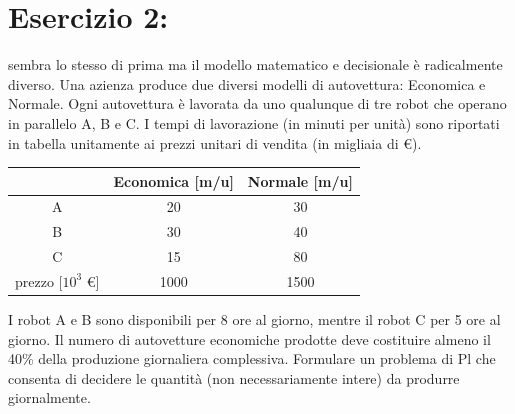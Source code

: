 \section{Esercizio 2:} sembra lo stesso di prima ma il modello matematico e decisionale è radicalmente diverso. Una azienza produce due diversi modelli di autovettura: Economica e Normale. Ogni autovettura è lavorata da uno qualunque di tre robot che operano in parallelo A, B e C. I tempi di lavorazione (in minuti per unità) sono riportati in tabella unitamente ai prezzi unitari di vendita (in migliaia di \euro).
\begin{table}[h!]
    \centering
    \begin{tabular}{|c|c|c|}
    \hline
     & Economica [m/u] & Normale [m/u]\\
    \hline
    \hline
    A & 20 & 30\\
    \hline
    B & 30 & 40\\
    \hline
    C & 15 & 80\\
    \hline
    prezzo [$10^3$ \euro] & 1000 & 1500\\
    \hline
    \end{tabular}
\end{table}
I robot A e B sono disponibili per 8 ore al giorno, mentre il robot C per 5 ore al giorno. Il numero di autovetture economiche prodotte deve costituire almeno il 40\% della produzione giornaliera complessiva. Formulare un problema di Pl che consenta di decidere le quantità (non necessariamente intere) da produrre giornalmente.

\vspace{1cm}


